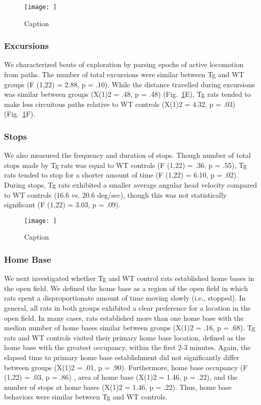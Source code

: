 \documentclass[fleqn,10pt]{wlscirep}
\begin{document}
\begin{figure}
    \centering
    \texttt{[image: ]}
    \caption{Caption}
    \label{locomotor_fig}
\end{figure}

\subsubsection*{Excursions}
We characterized bouts of exploration by parsing epochs of active locomotion from paths. The number of total excursions were similar between Tg and WT groups (F (1,22) = 2.88, p = .10). While the distance travelled during excursions was similar between groups (X(1)2 = .48, p = .48) (Fig.~\ref{locomotor_fig}E), Tg rats tended to make less circuitous paths relative to WT controls (X(1)2 = 4.32, p = .03) (Fig.~\ref{locomotor_fig}F).

\subsubsection*{Stops} We also measured the frequency and duration of stops. Though number of total stops made by Tg rats was equal to WT controls (F (1,22) = .36, p = .55), Tg rats tended to stop for a shorter amount of time (F (1,22) = 6.10, p = .02). During stops, Tg rats exhibited a smaller average angular head velocity compared to WT controls (16.6 vs. 20.6 deg/sec), though this was not statistically significant (F (1,22) = 3.03, p = .09). 

\begin{figure}
    \centering
    \texttt{[image: ]}
    \caption{Caption}
    \label{homebase_fig}
\end{figure}

\subsubsection*{Home Base} We next investigated whether Tg and WT control rats established home bases in the open field. We defined the home base as a region of the open field in which rats spent a disproportionate amount of time moving slowly (i.e., stopped). In general, all rats in both groups exhibited a clear preference for a location in the open field. In many cases, rats established more than one home base with the median number of home bases similar between groups (X(1)2 = .16, p = .68). Tg rats and WT controls visited their primary home base location, defined as the home base with the greatest occupancy, within the first 2-3 minutes. Again, the elapsed time to primary home base establishment did not significantly differ between groups (X(1)2 = .01, p = .90). Furthermore, home base occupancy (F (1,22) = .03, p = .86) , area of home base (X(1)2 = 1.46, p = .22), and the number of stops at home bases (X(1)2 = 1.46, p = .22). Thus, home base behaviors were similar between Tg and WT controls. 
\end{document}
